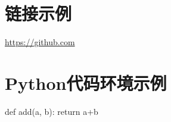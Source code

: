 \begin{appendices}
	\section{链接示例}
	\noindent\url{https://github.com}	
	
	\section{Python代码环境示例}
	\begin{python}	
	def add(a, b):
		return a+b
	\end{python}

\end{appendices}
